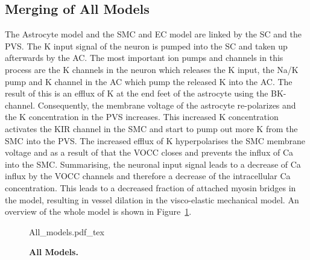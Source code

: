\newpage
\subsection{Merging of All Models}

The Astrocyte model and the \gls{SMC} and \gls{EC} model are linked by the SC and the \gls{PVS}. The \gls{K} input signal of the neuron is pumped into the \gls{SC} and taken up afterwards by the AC. The most important ion pumps and channels in this process are the \gls{K} channels in the neuron which releases the \gls{K} input,  the \gls{Na}/\gls{K} pump and \gls{K} channel in the \gls{AC} which pump the released \gls{K} into the AC.
The result of this is an efflux of \gls{K} at the end feet of the astrocyte using the BK-channel. Consequently, the membrane voltage of the astrocyte re-polarizes and the \gls{K} concentration in the PVS increases. This increased \gls{K} concentration activates the KIR channel in the \gls{SMC} and start to pump out more \gls{K} from the \gls{SMC} into the \gls{PVS}. The increased efflux of \gls{K} hyperpolarises the \gls{SMC} membrane voltage and as a result of that the VOCC closes and prevents the influx of \gls{Ca} into the \gls{SMC}.
Summarising, the neuronal input signal leads to a decrease of \gls{Ca} influx by the VOCC channels and therefore a decrease of the intracellular \gls{Ca} concentration. This leads to a decreased fraction of attached myosin bridges in the \citet{Hai1989} model, resulting in vessel dilation in the visco-elastic mechanical model. An overview of the whole model is shown in Figure~\ref{Overview}.

\begin{figure}[h!]
  \centering
  \def\svgwidth{450pt}
  \scriptsize 
  {All_models.pdf_tex}
  \caption{\textbf{All Models.}}
\label{Overview}
\end{figure}







